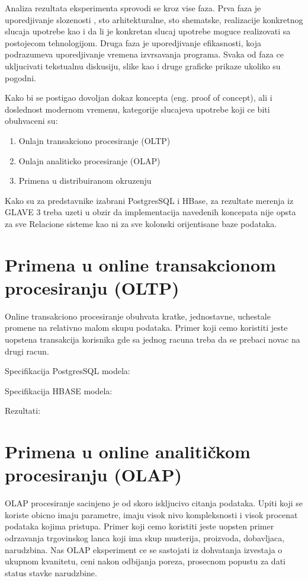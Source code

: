 \documentclass[12pt,oneside]{memoir}
\begin{document}
Analiza rezultata eksperimenta sprovodi se kroz vise faza. Prva faza je uporedjivanje slozenosti , sto arhitekturalne, sto shematske, realizacije konkretnog slucaja upotrebe kao i da li je konkretan slucaj upotrebe moguce realizovati sa postojecom tehnologijom. Druga faza je uporedjivanje efikasnosti, koja podrazumeva uporedjivanje vremena izvrsavanja programa.  Svaka od faza ce ukljucivati tekstualnu diskusiju, slike kao i druge graficke prikaze ukoliko su pogodni.

Kako bi se postigao dovoljan dokaz koncepta (eng. proof of concept), ali i doslednost modernom
vremenu, kategorije slucajeva upotrebe koji ce biti obuhvaceni su:
\begin{enumerate}
\item Onlajn transakciono procesiranje (OLTP)
\item Onlajn analiticko procesiranje (OLAP)
\item Primena u distribuiranom okruzenju
\end{enumerate}

Kako su za predstavnike izabrani PostgresSQL i HBase,  za rezultate merenja iz GLAVE 3 treba uzeti u obzir da implementacija navedenih koncepata nije opsta za sve Relacione sisteme kao ni za sve kolonski orijentisane baze podataka.
\section{Primena u online transakcionom procesiranju (OLTP)}

Online transakciono procesiranje obuhvata kratke, jednostavne, uchestale promene  na relativno malom skupu podataka. Primer koji cemo koristiti jeste uopstena transakcija korisnika gde sa jednog racuna treba da se prebaci novac na drugi racun.

Specifikacija PostgresSQL modela:

Specifikacija HBASE modela:

Rezultati:

\section{Primena u online analitičkom procesiranju (OLAP)}

OLAP procesiranje sacinjeno je od skoro iskljucivo citanja podataka. Upiti koji se koriste obicno imaju parametre, imaju visok nivo kompleksnosti i visok procenat podataka kojima pristupa.
Primer koji cemo koristiti jeste uopsten primer odrzavanja trgovinskog lanca koji ima skup musterija, proizvoda, dobavljaca,  narudzbina. 
Nas OLAP eksperiment ce se sastojati iz dohvatanja izvestaja o ukupnom kvanitetu, ceni nakon odbijanja poreza, prosecnom popustu za dati status stavke narudzbine.
\end{document}
